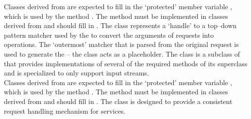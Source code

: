 Classes derived from  are expected to
fill in the `protected' member variable , which
is used by the method .
The method  must be implemented in classes derived from
 and should fill in
.
The  class represents a
`handle' to a top--down pattern matcher used by the
 to convert the arguments of
 requests into 
operations.
The `outermost' matcher that is parsed from the original request is used to generate the
 -- the  class acts as a placeholder.
The 
class is a subclass of 
that provides implementations of several of the required methods of its superclass and is
specialized to only support input streams.\\

Classes derived from  are expected to
fill in the `protected' member variable , which is
used by the method .
The method  must be implemented in classes derived from
 and should fill in
.
The  class is
designed to provide a consistent request handling mechanism for \mplusm{} services.\\


